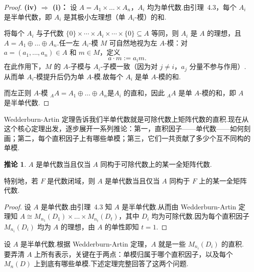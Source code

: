 \documentclass[11pt,a4paper]{article}
\theoremstyle{plain}
\theoremstyle{definition}
\newtheorem{cor}[thm]{推论}
\begin{document}
\begin{proof}
\medskip
\noindent \textbf{(iv) $\Rightarrow$ (i)：} 设 $A = A_1 \times \dots \times A_n$，$A_i$ 均为单代数.由引理~4.3，每个 $A_i$ 是半单代数，即 $A_i$ 是其极小左理想（单 $A_i$-模）的和.

将每个 $A_i$ 与子代数 $\{0\}\times\cdots\times A_i\times\cdots\times\{0\} \subseteq A$ 等同，则 $A_i$ 是 $A$ 的理想，且 $A = A_1 \oplus \dots \oplus A_n$.任一左 $A_i$-模 $M$ 可自然地视为左 $A$-模：对 $a = (a_1,\dots,a_n) \in A$ 和 $m \in M$，定义
\[
a \cdot m := a_i m.
\]
在此作用下，$M$ 的 $A$-子模与 $A_i$-子模一致（因为对 $j \neq i$，$a_j$ 分量不参与作用）.从而单 $A_i$-模提升后仍为单 $A$-模.故每个 $A_i$ 是单 $A$-模的和.

而左正则 $A$-模 ${}_A A = A_1 \oplus \dots \oplus A_n$是$A_i$ 的直和，因此 ${}_A A$ 是单 $A$-模的和，即 $A$ 是半单代数.
\end{proof}


\noindent Wedderburn-Artin 定理告诉我们半单代数就是可除代数上矩阵代数的直积.现在从这个核心定理出发，逐步展开一系列推论：第一，直积因子——单代数——如何刻画；第二，每个直积因子上有哪些单模；第三，它们一共贡献了多少个互不同构的单模.

\begin{cor}
$A$ 是单代数当且仅当 $A$ 同构于可除代数上的某一全矩阵代数.

特别地，若 $F$ 是代数闭域，则 $A$ 是单代数当且仅当 $A$ 同构于 $F$ 上的某一全矩阵代数.
\end{cor}

\begin{proof}
设 $A$ 是单代数.由引理~4.3 知 $A$ 是半单代数.从而由 Wedderburn-Artin 定理知 $A \cong M_{n_1}(D_1) \times \dots \times M_{n_t}(D_t)$，其中 $D_i$ 均为可除代数.因为每个直积因子 $M_{n_i}(D_i)$ 均为 $A$ 的理想，由 $A$ 的单性即知 $t=1$.
\end{proof}


\noindent 设 $A$ 是半单代数.根据 Wedderburn-Artin 定理，$A$ 就是一些 $M_{n_i}(D_i)$ 的直积.要弄清 $A$ 上所有表示，关键在于两点：单模归属于哪个直积因子，以及每个 $M_n(D)$ 上到底有哪些单模.下述定理完整回答了这两个问题.
\end{document}
